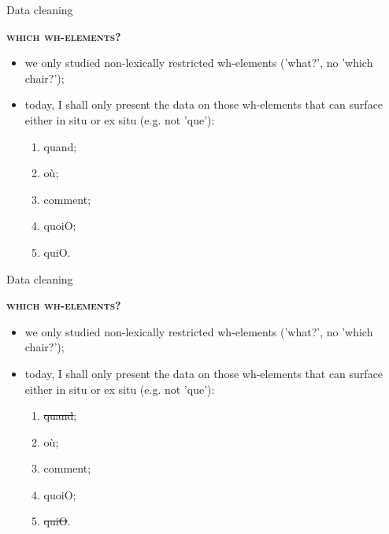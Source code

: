 \documentclass[lesson_slides]{subfiles}
\begin{document}
\begin{frame}[c]{Data cleaning}

    \textbf{\textsc{which wh-elements?}} \pause
    
    \begin{itemize}
        \item[\ding{227}] we only studied non-lexically restricted wh-elements ('what?', no 'which chair?'); \pause
        \item[\ding{227}] today, I shall only present the data on those wh-elements that can surface either in situ or ex situ (e.g. not 'que'): \pause
        \begin{enumerate}
            \item quand; \pause
            \item où; \pause
            \item comment; \pause
            \item quoiO; \pause
            \item quiO.
        \end{enumerate}
    \end{itemize}
    
\end{frame}
\begin{frame}[c]{Data cleaning}


    \textbf{\textsc{which wh-elements?}}
    
    \begin{itemize}
        \item[\ding{227}] we only studied non-lexically restricted wh-elements ('what?', no 'which chair?');
        \item[\ding{227}] today, I shall only present the data on those wh-elements that can surface either in situ or ex situ (e.g. not 'que'):
        \begin{enumerate}
            \item {\st{quand}};
            \item où;
            \item comment;
            \item quoiO;
            \item {\st{quiO}}.
        \end{enumerate}
    \end{itemize}
    
\end{frame}
\end{document}
